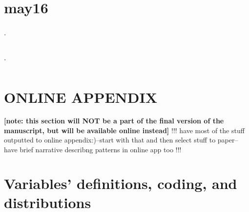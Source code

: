\documentclass[10pt, letterpaper]{article}
\begin{document}
\begin{spacing}{1.4}
\section{may16} %





\begin{spacing}{.9}
  \begin{table}[H]\centering \caption{.} \label{lm} \begin{scriptsize} \begin{tabular}{p{1.8in}p{.5in}p{.5in}p{.5in}p{.5in}p{.5in}p{.5in}p{.5in}p{.5in}p{.5in}p{.5
            in}p{.5in}p{.5 in}}\hline
        
         \end{tabular}\end{scriptsize}\end{table}
\end{spacing}

\begin{spacing}{.9}
  \begin{table}[H]\centering \caption{.} \label{wss} \begin{scriptsize} \begin{tabular}{p{1.8in}p{.5in}p{.5in}p{.5in}p{.5in}p{.5in}p{.5in}p{.5in}p{.5in}p{.5in}p{.5
            in}p{.5in}p{.5 in}}\hline
        
         \end{tabular}\end{scriptsize}\end{table}
\end{spacing}



\section*{\Huge ONLINE APPENDIX}
\textbf{[note: this section will NOT be a part of the final version of
  the manuscript, but will be available online instead]} %
!!!
have most of the stuff outputted to online appendix:)--start with that and then
select stuff to paper--have brief narrative describng patterns in online app too
!!!

\section*{Variables' definitions, coding, and distributions}
\label{app_var_des}



\end{spacing}
\end{document}
